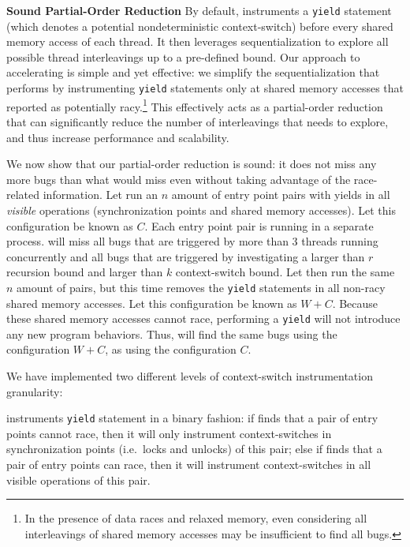 \medskip\noindent\textbf{Sound Partial-Order Reduction }
%
By default, \corral instruments a \texttt{yield} statement (which denotes a potential nondeterministic context-switch) before every shared memory access of each thread. It then leverages sequentialization to explore all possible thread interleavings up to a pre-defined bound. Our approach to accelerating \corral is simple and yet effective: we simplify the sequentialization that \corral performs by instrumenting \texttt{yield} statements only at shared memory accesses that \whoop reported as potentially racy.\footnote{In the presence of data races and relaxed memory, even considering all interleavings of shared memory accesses may be insufficient to find all bugs.} This effectively acts as a partial-order reduction that can significantly reduce the number of interleavings that \corral needs to explore, and thus increase performance and scalability.


We now show that our partial-order reduction is sound: it does not miss any more bugs than what \corral would miss even without taking advantage of the \whoop race-related information. Let \corral run an $n$ amount of entry point pairs with yields in all \emph{visible} operations (synchronization points and shared memory accesses). Let this configuration be known as $C$. Each entry point pair is running in a separate \corral process. \corral will miss all bugs that are triggered by more than 3 threads running concurrently and all bugs that are triggered by investigating a larger than $r$ recursion bound and larger than $k$ context-switch bound. Let \corral then run the same $n$ amount of pairs, but this time \whoop removes the \texttt{yield} statements in all non-racy shared memory accesses. Let this configuration be known as $W+C$. Because these shared memory accesses cannot race, performing a \texttt{yield} will not introduce any new program behaviors. Thus, \corral will find the same bugs using the configuration $W+C$, as using the configuration $C$.

We have implemented two different levels of context-switch instrumentation granularity:

\yieldcoarse instruments \texttt{yield} statement in a binary fashion: if \whoop
finds that a pair of entry points cannot race, then it will only instrument
context-switches in synchronization points (i.e.\ locks and unlocks) of this pair; else if \whoop finds
that a pair of entry points can race, then it will instrument context-switches
in all visible operations of this pair.

